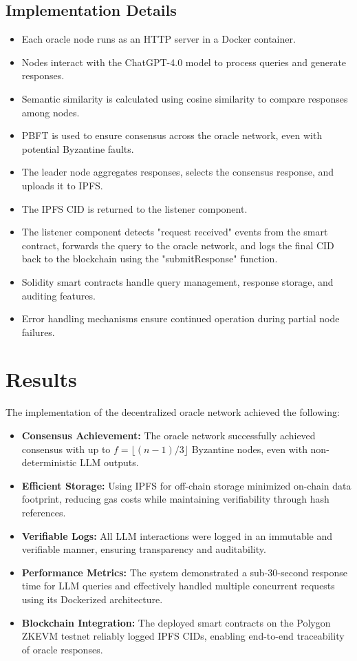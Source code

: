\documentclass[12pt]{article}
\begin{document}
\subsection{Implementation Details}
\begin{itemize}
    \item Each oracle node runs as an HTTP server in a Docker container.
    \item Nodes interact with the ChatGPT-4.0 model to process queries and generate responses.
    \item Semantic similarity is calculated using cosine similarity to compare responses among nodes.
    \item PBFT is used to ensure consensus across the oracle network, even with potential Byzantine faults.
    \item The leader node aggregates responses, selects the consensus response, and uploads it to IPFS.
    \item The IPFS CID is returned to the listener component.
    \item The listener component detects "request received" events from the smart contract, forwards the query to the oracle network, and logs the final CID back to the blockchain using the "submitResponse" function.
    \item Solidity smart contracts handle query management, response storage, and auditing features.
    \item Error handling mechanisms ensure continued operation during partial node failures.
\end{itemize}

\section{Results}
The implementation of the decentralized oracle network achieved the following:

\begin{itemize}
    \item \textbf{Consensus Achievement:} The oracle network successfully achieved consensus with up to $f = \lfloor(n-1)/3\rfloor$ Byzantine nodes, even with non-deterministic LLM outputs.
    \item \textbf{Efficient Storage:} Using IPFS for off-chain storage minimized on-chain data footprint, reducing gas costs while maintaining verifiability through hash references.
    \item \textbf{Verifiable Logs:} All LLM interactions were logged in an immutable and verifiable manner, ensuring transparency and auditability.
    \item \textbf{Performance Metrics:} The system demonstrated a sub-30-second response time for LLM queries and effectively handled multiple concurrent requests using its Dockerized architecture.
    \item \textbf{Blockchain Integration:} The deployed smart contracts on the Polygon ZKEVM testnet reliably logged IPFS CIDs, enabling end-to-end traceability of oracle responses.
\end{itemize}
\end{document}
